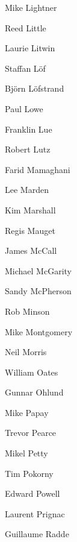 \begin{minipage}[t]{100pt}
    \frontNamesContinuation
    Mike Lightner\par
    Reed Little\par
    Laurie Litwin\par
    Staffan Löf\par
    Björn Löfstrand\par
    Paul Lowe\par
    Franklin Lue\par
    Robert Lutz\par
    Farid Mamaghani\par
    Lee Marden\par
    Kim Marshall\par
    Regis Mauget\par
    James McCall\par
    Michael McGarity\par
    Sandy McPherson\par
    Rob Minson\par
    Mike Montgomery\par
    Neil Morris\par
    William Oates\par
    Gunnar Ohlund\par
    Mike Papay\par
    Trevor Pearce\par
    Mikel Petty\par
    Tim Pokorny\par
    Edward Powell\par
    Laurent Prignac\par
    Guillaume Radde
\end{minipage}%
\hspace*{52.55pt}%
